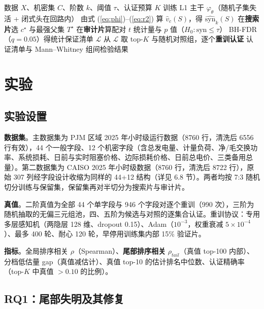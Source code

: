 \documentclass[10.5pt,compsoc,UTF8]{CjC}
\theoremstyle{mystyle}
\newcommand{\syn}{\mathrm{syn}}
\begin{document}
\begin{algorithm}[htbp]
\caption{三层协同发现与认证}
\label{alg:pipeline}
\begin{algorithmic}[1]
\Require 数据 $X$、机密集 $C$、阶数 $k$、阈值 $\tau$、认证预算 $K$
\State 训练 L1 主干 $\varphi_\theta$（随机子集失活 + 闭式头在回路内）
  \State 由式 (\ref{eq:phi})--(\ref{eq:r2}) 算 $\hat{v}_c(S)$，得 $\widehat{\syn}_k(S)$ 
\EndFor
{}
  \State 在\textbf{搜索片}选 $c^\star$ 与最强父集 $T^\star$
  \State 在\textbf{审计片}算配对 $t$ 统计量与 $p$ 值（$H_0:\syn\le\tau$）
\EndFor
\State BH-FDR（$q=0.05$）得统计保证清单 $\mathcal{L}$
\State 从 $\mathcal{L}$ 取 top-$K$ 与随机对照组，逐个\textbf{重训认证}
\State \Return 认证清单与 Mann--Whitney 组间检验结果
\end{algorithmic}
\end{algorithm}

\section{\heiti 实验}

\subsection{实验设置}

\textbf{数据集}。主数据集为 PJM 区域 2025 年小时级运行数据（8760 行，清洗后 6556 行有效），44 个一般字段、12 个机密字段（含总发电量、计量负荷、净/毛交换功率、系统损耗、日前与实时阻塞价格、边际损耗价格、日前总电价、三类备用总量）。第二数据集为 CAISO 2025 年小时级数据（8760 行，清洗后 8722 行），原始 307 列经字段设计收缩为同样的 44+12 结构（详见 6.8 节）。两者均按 7:3 随机切分训练与保留集，保留集再对半切分为搜索片与审计片。

\textbf{真值}。二阶真值为全部 44 个单字段与 946 个字段对逐个重训（990 次），三阶为随机抽取的无偏三元组池，四、五阶为候选与对照的逐集合认证。重训协议：专用多层感知机（两隐层 128 维、dropout 0.15）、Adam（$10^{-3}$，权重衰减 $5\times10^{-4}$）、最多 400 轮、耐心 120 轮，早停用训练集内部 15\% 验证片。

\textbf{指标}。全局排序相关 $\rho$（Spearman）、\textbf{尾部排序相关} $\rho_{tail}$（真值 top-100 内部）、分档低估量 gap（真值减估计）、真值 top-10 的估计排名中位数、认证精确率（top-$K$ 中真值 $>0.10$ 的比例）。

\subsection{RQ1：尾部失明及其修复}
\end{document}
